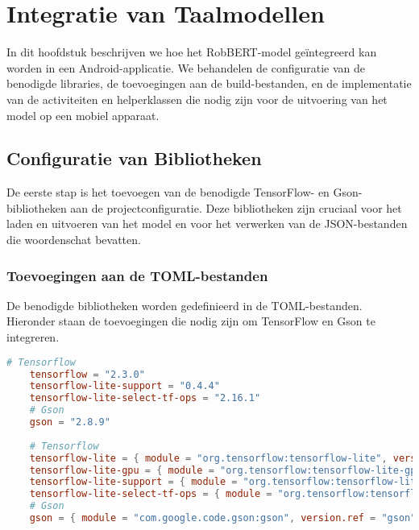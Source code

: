 
\chapter{Integratie van Taalmodellen}
\label{ch:integratie-taalmodellen}

In dit hoofdstuk beschrijven we hoe het RobBERT-model geïntegreerd kan worden in een Android-applicatie. We behandelen de configuratie van de benodigde libraries, de toevoegingen aan de build-bestanden, en de implementatie van de activiteiten en helperklassen die nodig zijn voor de uitvoering van het model op een mobiel apparaat.

\section{Configuratie van Bibliotheken}

De eerste stap is het toevoegen van de benodigde TensorFlow- en Gson-biblio\-the\-ken aan de projectconfiguratie. Deze bibliotheken zijn cruciaal voor het laden en uitvoeren van het model en voor het verwerken van de JSON-bestanden die woordenschat bevatten.

\subsection{Toevoegingen aan de TOML-bestanden}

De benodigde bibliotheken worden gedefinieerd in de TOML-bestanden. Hieronder staan de toevoegingen die nodig zijn om TensorFlow en Gson te integreren.

\begin{lstlisting}[language=Toml, caption={Toevoegingen aan de TOML-bestanden}]
    # Tensorflow
    tensorflow = "2.3.0"
    tensorflow-lite-support = "0.4.4"
    tensorflow-lite-select-tf-ops = "2.16.1"
    # Gson
    gson = "2.8.9"
    
    # Tensorflow
    tensorflow-lite = { module = "org.tensorflow:tensorflow-lite", version.ref = "tensorflow" }
    tensorflow-lite-gpu = { module = "org.tensorflow:tensorflow-lite-gpu", version.ref = "tensorflow" }
    tensorflow-lite-support = { module = "org.tensorflow:tensorflow-lite-support", version.ref = "tensorflow-lite-support" }
    tensorflow-lite-select-tf-ops = { module = "org.tensorflow:tensorflow-lite-select-tf-ops", version.ref = "tensorflow-lite-select-tf-ops" }
    # Gson
    gson = { module = "com.google.code.gson:gson", version.ref = "gson" }
\end{lstlisting}

